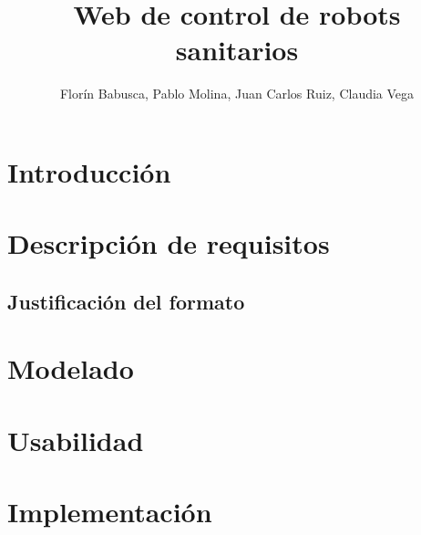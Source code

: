 \documentclass[12pt, a4paper]{exam}
\title{\textbf{Web de control de robots sanitarios}}
\author{Florín Babusca, Pablo Molina, Juan Carlos Ruiz, Claudia Vega}
\begin{document}

\begin{titlingpage}
\maketitle
\end{titlingpage}
\tableofcontents

\section{Introducción}

\section{Descripción de requisitos}
\label{sec:DocRequisitos}
    \subsection{Justificación del formato}
    


\section{Modelado}


\section{Usabilidad}


\section{Implementación}


\printbibliography
\newpage


\end{document}
